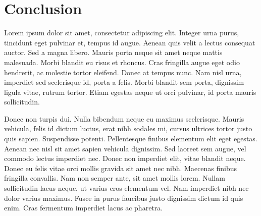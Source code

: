 \section{Conclusion}
Lorem ipsum dolor sit amet, consectetur adipiscing elit. Integer urna purus, tincidunt eget pulvinar et, tempus id augue. Aenean quis velit a lectus consequat auctor. Sed a magna libero. Mauris porta neque sit amet neque mattis malesuada. Morbi blandit eu risus et rhoncus. Cras fringilla augue eget odio hendrerit, ac molestie tortor eleifend. Donec at tempus nunc. Nam nisl urna, imperdiet sed scelerisque id, porta a felis. Morbi blandit sem porta, dignissim ligula vitae, rutrum tortor. Etiam egestas neque ut orci pulvinar, id porta mauris sollicitudin.

Donec non turpis dui. Nulla bibendum neque eu maximus scelerisque. Mauris vehicula, felis id dictum luctus, erat nibh sodales mi, cursus ultrices tortor justo quis sapien. Suspendisse potenti. Pellentesque finibus elementum elit eget egestas. Aenean nec nisl sit amet sapien vehicula dignissim. Sed laoreet sem augue, vel commodo lectus imperdiet nec. Donec non imperdiet elit, vitae blandit neque. Donec eu felis vitae orci mollis gravida sit amet nec nibh. Maecenas finibus fringilla convallis. Nam non semper ante, sit amet mollis lorem. Nullam sollicitudin lacus neque, ut varius eros elementum vel. Nam imperdiet nibh nec dolor varius maximus. Fusce in purus faucibus justo dignissim dictum id quis enim. Cras fermentum imperdiet lacus ac pharetra.



\FloatBarrier